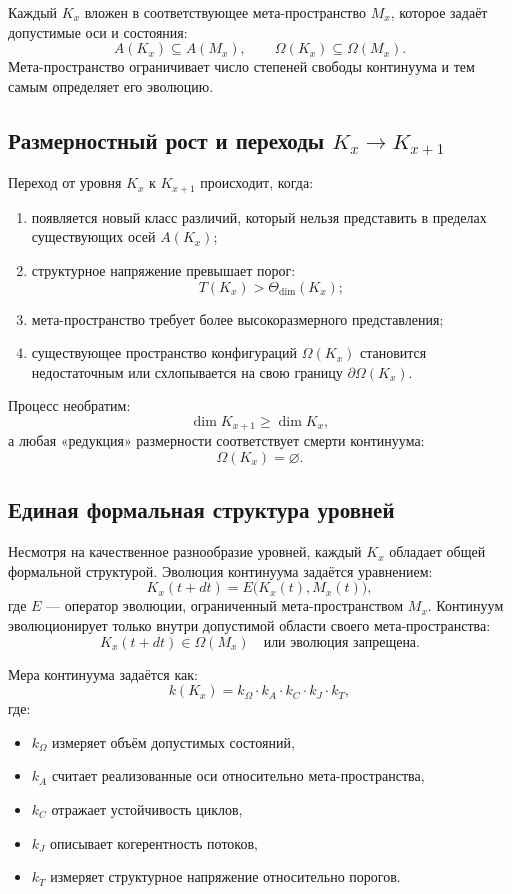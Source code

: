 Каждый $K_x$ вложен в соответствующее мета-пространство $M_x$, которое
задаёт допустимые оси и состояния:
\[
A(K_x) \subseteq A(M_x), \qquad
\Omega(K_x) \subseteq \Omega(M_x).
\]
Мета-пространство ограничивает число степеней свободы континуума и
тем самым определяет его эволюцию.


\subsection{Размерностный рост и переходы $K_x \to K_{x+1}$}

Переход от уровня $K_x$ к $K_{x+1}$ происходит, когда:
\begin{enumerate}
    \item появляется новый класс различий, который нельзя представить
          в пределах существующих осей $A(K_x)$;
    \item структурное напряжение превышает порог:
    \[
        T(K_x) > \Theta_{\mathrm{dim}}(K_x);
    \]
    \item мета-пространство требует более высокоразмерного представления;
    \item существующее пространство конфигураций $\Omega(K_x)$ становится
          недостаточным или схлопывается на свою границу $\partial\Omega(K_x)$.
\end{enumerate}

Процесс необратим:
\[
\dim K_{x+1} \ge \dim K_x,
\]
а любая «редукция» размерности соответствует смерти континуума:
\[
\Omega(K_x) = \varnothing.
\]


\subsection{Единая формальная структура уровней}

Несмотря на качественное разнообразие уровней, каждый $K_x$ обладает общей
формальной структурой.
Эволюция континуума задаётся уравнением:
\[
K_x(t + dt) = E\bigl(K_x(t), M_x(t)\bigr),
\]
где $E$ — оператор эволюции, ограниченный мета-пространством
$M_x$.
Континуум эволюционирует только внутри допустимой области своего
мета-пространства:
\[
K_x(t+dt) \in \Omega(M_x)
\quad\text{или эволюция запрещена}.
\]

Мера континуума задаётся как:
\[
k(K_x) =
k_{\Omega} \cdot k_{A} \cdot k_{C} \cdot k_{J} \cdot k_{T},
\]
где:
\begin{itemize}
    \item $k_{\Omega}$ измеряет объём допустимых состояний,
    \item $k_{A}$ считает реализованные оси относительно мета-пространства,
    \item $k_{C}$ отражает устойчивость циклов,
    \item $k_{J}$ описывает когерентность потоков,
    \item $k_{T}$ измеряет структурное напряжение относительно порогов.
\end{itemize}


